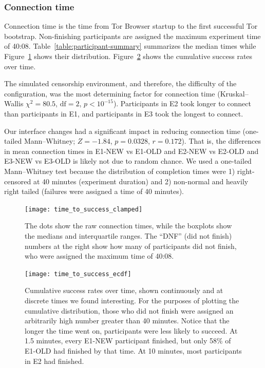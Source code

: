 \documentclass[USenglish,oneside,twocolumn]{article}
\begin{document}
\subsubsection{Connection time} 
Connection time is the time from Tor Browser startup to the first successful Tor bootstrap. Non-finishing participants are assigned the maximum experiment time of 40:08. Table~\ref{table:participant-summary} summarizes the median times while Figure~\ref{fig:time_to_success_clamped} shows their distribution. Figure~\ref{fig:time_to_success_ecdf} shows the cumulative success rates over time. 

The simulated censorship environment, and therefore, the difficulty of the configuration, was the most determining factor for connection time (Kruskal--Wallis $\chi^2 = 80.5$, $\mbox{df} = 2$, $p < 10^{-15}$). Participants in E2 took longer to connect than participants in E1, and participants in E3 took the longest to connect.

Our interface changes had a significant impact in reducing connection time (one-tailed Mann--Whitney; $ Z = -1.84$, $p = 0.0328$, $r= 0.172$). That is, the differences in mean connection times in E1-NEW vs E1-OLD and E2-NEW vs E2-OLD and E3-NEW vs E3-OLD is likely not due to random chance. We used a one-tailed Mann--Whitney test because the distribution of completion times were 1) right-censored at 40 minutes (experiment duration) and 2) non-normal and heavily right tailed (failures were assigned a time of 40 minutes). 

\begin{figure}[t]
\centering
\texttt{[image: time\_to\_success\_clamped]}
\caption{
The dots show the raw connection times,
while the boxplots show the medians and interquartile ranges.
The ``DNF'' (did not finish) numbers at the right show how many of participants 
did not finish, who were assigned the maximum time of 40:08.
}
\label{fig:time_to_success_clamped}
\end{figure}

\begin{figure}[t]
\centering
\texttt{[image: time\_to\_success\_ecdf]}

\caption{
Cumulative success rates over time, shown continuously and at discrete times we found interesting.
For the purposes of plotting the cumulative distribution, those who did not finish were assigned
an arbitrarily high number greater than 40 minutes. 
Notice that the longer the time went on, participants were less likely to succeed. 
At 1.5 minutes, every E1-NEW participant finished,
but only 58\% of E1-OLD had finished by that time.  
At 10 minutes, most participants in E2 had finished. 
}
\label{fig:time_to_success_ecdf}
\end{figure}
\end{document}
